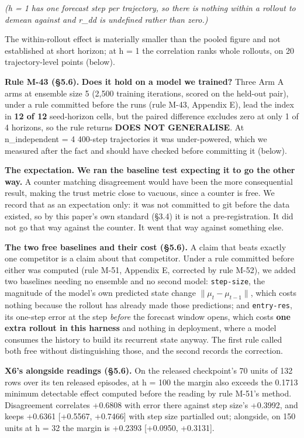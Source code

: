 \documentclass[10pt]{article}
\begin{document}
\emph{(h = 1 has one forecast step per trajectory, so there is nothing within a rollout to demean against and r\_dd is undefined rather than zero.)}

The within-rollout effect is materially smaller than the pooled figure and not established at short horizon; at h = 1 the correlation ranks whole rollouts, on 20 trajectory-level points (below).

\textbf{Rule M-43 (\S{}5.6).} \textbf{Does it hold on a model we trained?} Three Arm A arms at ensemble size 5 (2,500 training iterations, scored on the held-out pair), under a rule committed before the runs (rule M-43, Appendix E), lead the index in \textbf{12 of 12} seed-horizon cells, but the paired difference excludes zero at only 1 of 4 horizons, so the rule returns \textbf{DOES NOT GENERALISE}. At n\_independent = 4 400-step trajectories it was under-powered, which we measured after the fact and should have checked before committing it (below).

\textbf{The expectation.} \textbf{We ran the baseline test expecting it to go the other way.} A counter matching disagreement would have been the more consequential result, making the trust metric close to vacuous, since a counter is free. We record that as an expectation only: it was not committed to git before the data existed, so by this paper's own standard (\S{}3.4) it is not a pre-registration. It did not go that way against the counter. It went that way against something else.

\textbf{The two free baselines and their cost (\S{}5.6).} A claim that beats exactly one competitor is a claim about that competitor. Under a rule committed before either was computed (rule M-51, Appendix E, corrected by rule M-52), we added two baselines needing no ensemble and no second model: \texttt{step-size}, the magnitude of the model's own predicted state change $\lVert \mu_t - \mu_{t-1} \rVert$, which costs nothing because the rollout has already made those predictions; and \texttt{entry-res}, its one-step error at the step \emph{before} the forecast window opens, which costs \textbf{one extra rollout in this harness} and nothing in deployment, where a model consumes the history to build its recurrent state anyway. The first rule called both free without distinguishing those, and the second records the correction.

\textbf{X6's alongside readings (\S{}5.6).} On the released checkpoint's 70 units of 132 rows over its ten released episodes, at h = 100 the margin also exceeds the 0.1713 minimum detectable effect computed before the reading by rule M-51's method. Disagreement correlates +0.6808 with error there against step size's +0.3992, and keeps +0.6361 [+0.5567, +0.7466] with step size partialled out; alongside, on 150 units at h = 32 the margin is +0.2393 [+0.0950, +0.3131].
\end{document}

